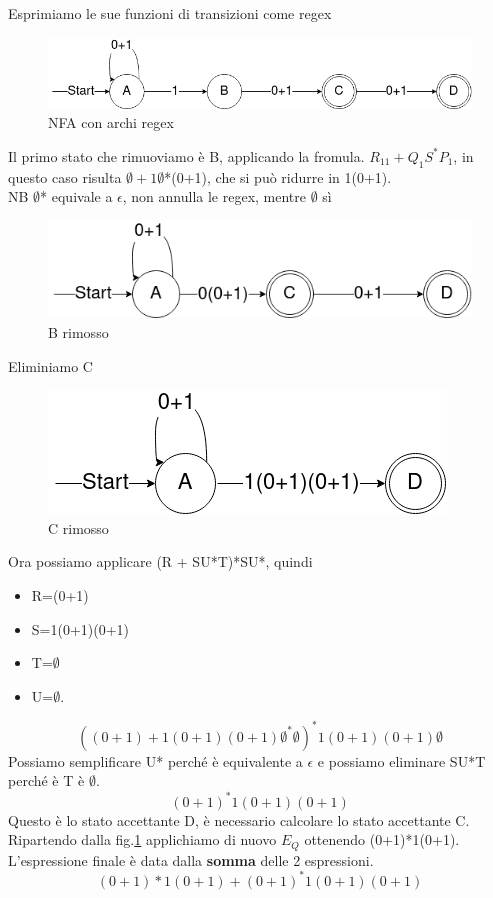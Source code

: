 \documentclass[12pt]{article}
\begin{document}
	Esprimiamo le sue funzioni di transizioni come regex

	\begin{figure}[ht]
		\includegraphics[scale = 0.5]{media/dfa_s2.png}
		\centering
		\caption{NFA con archi regex}
	\end{figure}

	Il primo stato che rimuoviamo è B, applicando la fromula. $R_{11} + Q_1 S^* P_1$, in questo caso risulta $\emptyset + 1\emptyset$*(0+1), che si può  ridurre in 1(0+1).
	\\ NB $\emptyset$* equivale a $\epsilon$, non annulla le regex, mentre $\emptyset$ sì


	\begin{figure}[ht]
		\includegraphics[scale = 0.5]{media/dfa_s3.png}
		\centering
		\caption{B rimosso}
		\label{b rimosso}
	\end{figure}

	\newpage
	Eliminiamo C

	\begin{figure}[ht]
		\includegraphics[scale = 0.5]{media/dfa_s4.png}
		\centering
		\caption{C rimosso}
	\end{figure}

	Ora possiamo applicare (R + SU*T)*SU*, quindi
	\begin{itemize}
		\item R=(0+1)
		\item S=1(0+1)(0+1)
		\item T=$\emptyset$
		\item U=$\emptyset$.
	\end{itemize}
	\[((0+1) + 1(0+1)(0+1)\emptyset^*\emptyset)^*1(0+1)(0+1)\emptyset\]
	Possiamo semplificare U* perché è equivalente a $\epsilon$ e possiamo eliminare SU*T perché è T è $\emptyset$.
	\[(0+1)^*1(0+1)(0+1)\]
	Questo è lo stato accettante D, è necessario calcolare lo stato accettante C. Ripartendo dalla fig.\ref{b rimosso} applichiamo di nuovo $E_Q$ ottenendo (0+1)*1(0+1).
	\\ L'espressione finale è data dalla \textbf{somma} delle 2 espressioni.
	\[(0+1)*1(0+1) + (0+1)^*1(0+1)(0+1)\]
\end{document}
